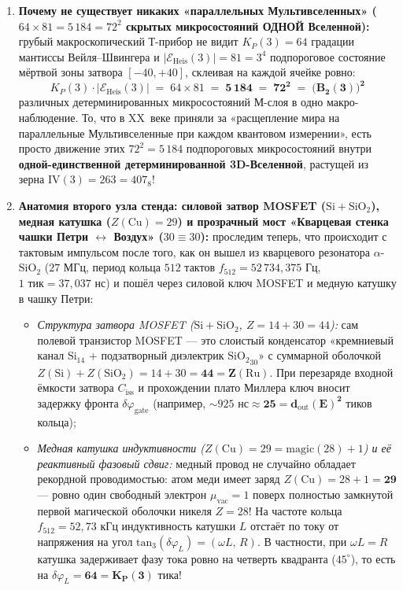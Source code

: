 \begin{enumerate}[label=\textbf{\arabic*.},leftmargin=*]
\item \textbf{Почему не существует никаких «параллельных Мультивселенных» ($64\times 81 = 5\,184 = 72^2$ скрытых микросостояний ОДНОЙ Вселенной):}
  грубый макроскопический Т-прибор не видит $K_P(3) = 64$ градации мантиссы Вейля--Швингера и $|\mathcal{E}_{\mathrm{Heis}}(3)| = 81 = 3^4$ подпороговое состояние мёртвой зоны затвора $[-40,+40]$, склеивая на каждой ячейке ровно:
  \[
    K_P(3)\cdot |\mathcal{E}_{\mathrm{Heis}}(3)| \;=\; 64 \times 81 \;=\; \mathbf{5\,184 \;=\; 72^2 \;=\; \bigl(B_2(3)\bigr)^2}
  \]
  различных детерминированных микросостояний М-слоя в одно макро-наблюдение. То, что в XX~веке приняли за «расщепление мира на параллельные Мультивселенные при каждом квантовом измерении», есть просто движение этих $72^2 = 5\,184$ подпороговых микросостояний внутри \textbf{одной-единственной детерминированной 3D-Вселенной}, растущей из зерна $\mathrm{IV}(3) = 263 = 407_8$!
\item \textbf{Анатомия второго узла стенда: силовой затвор MOSFET ($\mathrm{Si + SiO_2}$), медная катушка ($Z(\mathrm{Cu}) = 29$) и прозрачный мост «Кварцевая стенка чашки Петри $\leftrightarrow$ Воздух» ($30 \equiv 30$):}
  проследим теперь, что происходит с тактовым импульсом после того, как он вышел из кварцевого резонатора $\alpha$-$\mathrm{SiO_2}$ ($27\text{ МГц}$, период кольца $512$ тактов $f_{512} = 52\,734{,}375\text{ Гц}$, $1\text{ тик} = 37{,}037\text{ нс}$) и пошёл через силовой ключ MOSFET и медную катушку в чашку Петри:
  \begin{itemize}[noitemsep]
  \item \emph{Структура затвора MOSFET ($\mathrm{Si} + \mathrm{SiO_2}$, $Z = 14 + 30 = 44$):}
    сам полевой транзистор MOSFET --- это слоистый конденсатор «кремниевый канал $\mathrm{Si}_{14}$ $+$ подзатворный диэлектрик $\mathrm{SiO_2}_{30}$» с суммарной оболочкой $Z(\mathrm{Si}) + Z(\mathrm{SiO_2}) = 14 + 30 = \mathbf{44 = Z(\mathrm{Ru})}$. При перезаряде входной ёмкости затвора $C_{\mathrm{iss}}$ и прохождении плато Миллера ключ вносит задержку фронта $\delta\varphi_{\mathrm{gate}}$ (например, $\sim 925\text{ нс} \approx \mathbf{25 = d_{\mathrm{out}}(E)^2}$ тиков кольца);
  \item \emph{Медная катушка индуктивности ($Z(\mathrm{Cu}) = 29 = \mathrm{magic}(28) + 1$) и её реактивный фазовый сдвиг:}
    медный провод не случайно обладает рекордной проводимостью: атом меди имеет заряд $Z(\mathrm{Cu}) = 28 + 1 = \mathbf{29}$ --- ровно один свободный электрон $\mu_{\mathrm{vac}} = 1$ поверх полностью замкнутой первой магической оболочки никеля $Z = 28$! На частоте кольца $f_{512} = 52{,}73\text{ кГц}$ индуктивность катушки $L$ отстаёт по току от напряжения на угол $\mathrm{tan}_3(\delta\varphi_L) = (\omega L,\,R)$. В частности, при $\omega L = R$ катушка задерживает фазу тока ровно на четверть квадранта ($45^\circ$), то есть на $\delta\varphi_L = \mathbf{64 = K_P(3)}$ тика!

\end{itemize}
\end{enumerate}
